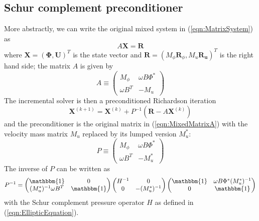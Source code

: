 \documentclass[12pt]{article}
\renewcommand{\vec}[1]{\boldsymbol{#1}}
\begin{document}
\subsection{Schur complement preconditioner}
More abstractly, we can write the original mixed system in (\ref{eqn:MatrixSystem}) as
\begin{equation}
  A\vec{X} = \vec{R}
\end{equation}
where $\vec{X}=(\vec{\Phi},\vec{U})^T$ is the state vector and 
$\vec{R}=(M_{\phi}\vec{R}_{\phi},M_u\vec{R}_{\vec{u}})^T$ is the right hand side; the matrix $A$ is given by
\begin{equation}
  A \equiv
\begin{pmatrix}
  M_\phi & \omega B\Phi^* \\
  \omega B^T & -M_u
\end{pmatrix}
\label{eqn:MixedMatrixA}
\end{equation}
The incremental solver is then a preconditioned Richardson iteration
\begin{equation}
  \vec{X}^{(k+1)} = \vec{X}^{(k)} + P^{-1}\left(\vec{R}-A\vec{X}^{(k)}\right)
\end{equation}
and the preconditioner is the original matrix in (\ref{eqn:MixedMatrixA}) with the velocity mass matrix $M_u$ replaced by its lumped version $M_u^*$:
\begin{equation}
    P \equiv
\begin{pmatrix}
  M_\phi & \omega B\Phi^* \\
  \omega B^T & -M^*_u
\end{pmatrix}
\end{equation}
The inverse of $P$ can be written as
\begin{equation}
    P^{-1} =
\begin{pmatrix}
  \mathbbm{1} & 0 \\
 (M_u^*)^{-1}\omega B^T  & \mathbbm{1}
\end{pmatrix}
\begin{pmatrix}
  H^{-1} & 0 \\
  0 & -(M_u^*)^{-1}
\end{pmatrix}
\begin{pmatrix}
  \mathbbm{1} & \omega B\Phi^* (M_u^*)^{-1} \\
  0 & \mathbbm{1}
\end{pmatrix}
\end{equation}
with the Schur complement pressure operator $H$ as defined in (\ref{eqn:EllipticEquation}).
\end{document}
